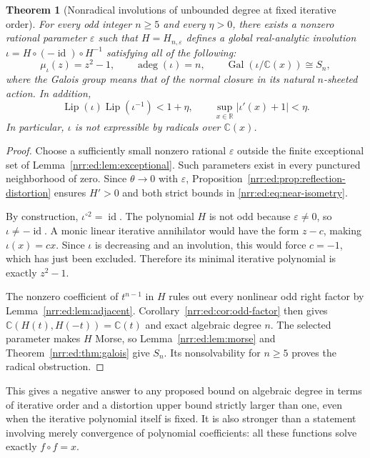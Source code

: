 \documentclass[11pt,letterpaper]{article}
\newtheorem{theorem}{Theorem}[section]
\theoremstyle{definition}
\theoremstyle{remark}
\newcommand{\R}{\mathbb R}
\newcommand{\C}{\mathbb C}
\newcommand{\id}{\operatorname{id}}
\newcommand{\Lip}{\operatorname{Lip}}
\newcommand{\Gal}{\operatorname{Gal}}
\newcommand{\algdeg}{\operatorname{adeg}}
\newcommand{\eps}{\varepsilon}
\begin{document}
\begin{theorem}[Nonradical involutions of unbounded degree at fixed iterative order]
\label{nrr:ed:thm:fixed-involution}
For every odd integer $n\ge5$ and every $\eta>0$, there exists a nonzero rational
parameter $\eps$ such that $H=H_{n,\eps}$ defines a global real-analytic
involution $\iota=H\circ(-\id)\circ H^{-1}$ satisfying all of the following:
\begin{equation}
 \mu_\iota(z)=z^2-1,\qquad \algdeg(\iota)=n,\qquad
 \Gal(\iota/\C(x))\cong S_n,
 \label{nrr:ed:eq:fixed-complexity}
\end{equation}
where the Galois group means that of the normal closure in its natural
$n$-sheeted action. In addition,
\begin{equation}
 \Lip(\iota)\Lip(\iota^{-1})<1+\eta,\qquad
 \sup_{x\in\R}|\iota'(x)+1|<\eta.
 \label{nrr:ed:eq:near-isometry}
\end{equation}
In particular, $\iota$ is not expressible by radicals over $\C(x)$.
\end{theorem}

\begin{proof}
Choose a sufficiently small nonzero rational $\eps$ outside the finite exceptional
set of Lemma~\ref{nrr:ed:lem:exceptional}. Such parameters exist in every punctured
neighborhood of zero. Since $\theta\to0$ with $\eps$, Proposition~\ref{nrr:ed:prop:reflection-distortion}
ensures $H'>0$ and both strict bounds in \eqref{nrr:ed:eq:near-isometry}.

By construction, $\iota^{\circ2}=\id$. The polynomial $H$ is not odd because
$\eps\ne0$, so $\iota\ne-\id$. A monic linear iterative annihilator would have
the form $z-c$, making $\iota(x)=cx$. Since $\iota$ is decreasing and an
involution, this would force $c=-1$, which has just been excluded. Therefore
its minimal iterative polynomial is exactly $z^2-1$.

The nonzero coefficient of $t^{n-1}$ in $H$ rules out every nonlinear odd right
factor by Lemma~\ref{nrr:ed:lem:adjacent}. Corollary~\ref{nrr:ed:cor:odd-factor} then gives
$\C(H(t),H(-t))=\C(t)$ and exact algebraic degree $n$. The selected parameter
makes $H$ Morse, so Lemma~\ref{nrr:ed:lem:morse} and Theorem~\ref{nrr:ed:thm:galois} give $S_n$.
Its nonsolvability for $n\ge5$ proves the radical obstruction.
\end{proof}

This gives a negative answer to any proposed bound on algebraic degree in terms
of iterative order and a distortion upper bound strictly larger than one, even
when the iterative polynomial itself is fixed. It is also stronger than a
statement involving merely convergence of polynomial coefficients: all these
functions solve exactly $f\circ f=x$.
\end{document}

